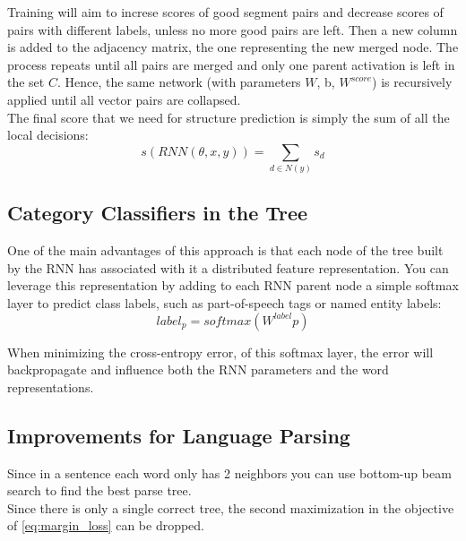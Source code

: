 Training will aim to increse scores of good segment pairs and decrease scores of
pairs with different labels, unless no more good pairs are left. Then a new
column is added to the adjacency matrix, the one representing the new merged
node. The process repeats until all pairs are merged and only one parent
activation is left in the set $C$. Hence, the same network (with parameters $W$,
b, $W^{score}$) is recursively applied until all vector pairs are collapsed.\\

The final score that we need for structure prediction is simply the sum of all
the local decisions:
\begin{equation}
	s(RNN(\theta, x, y)) = \sum_{d \in N(y)} s_{d}
\end{equation}

\subsection{Category Classifiers in the Tree}

One of the main advantages of this approach is that each node of the tree built
by the RNN has associated with it a distributed feature representation. You can
leverage this representation by adding to each RNN parent node a simple softmax
layer to predict class labels, such as part-of-speech tags or named entity
labels:
\begin{equation}
	label_p = softmax(W^{label} p)
\end{equation}

When minimizing the cross-entropy error, of this softmax layer, the error will
backpropagate and influence both the RNN parameters and the word
representations.

\subsection{Improvements for Language Parsing}

Since in a sentence each word only has 2 neighbors you can use bottom-up beam
search to find the best parse tree.\\
Since there is only a single correct tree, the second maximization in the
objective of \autoref{eq:margin_loss} can be dropped.
